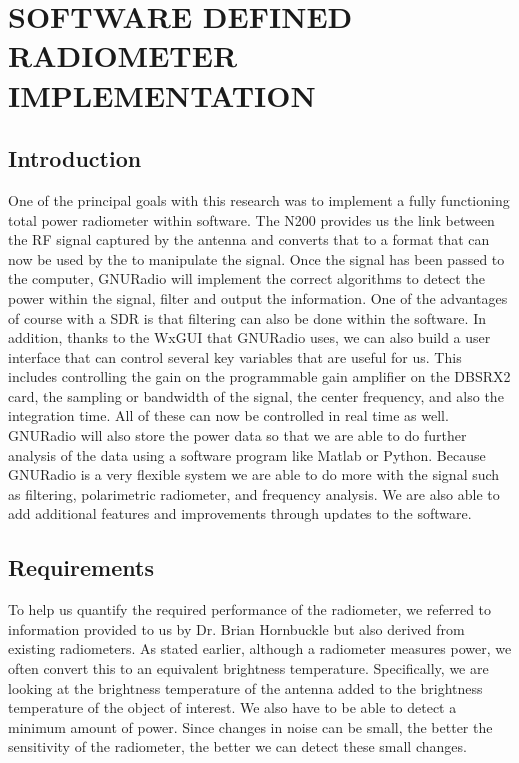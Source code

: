 \chapter{SOFTWARE DEFINED RADIOMETER IMPLEMENTATION}\label{ch:implementation}

\section{Introduction}
One of the principal goals with this research was to implement a fully functioning total power radiometer within software.  The N200 provides us the link between the RF signal captured by the antenna and converts that to a format that can now be used by the to manipulate the signal.  Once the signal has been passed to the computer, GNURadio will implement the correct algorithms to detect the power within the signal, filter and output the information.  One of the advantages of course with a SDR is that filtering can also be done within the software.  In addition, thanks to the WxGUI that GNURadio uses, we can also build a user interface that can control several key variables that are useful for us.  This includes controlling the gain on the programmable gain amplifier on the DBSRX2 card, the sampling or bandwidth of the signal, the center frequency, and also the integration time.  All of these can now be controlled in real time as well.  GNURadio will also store the power data so that we are able to do further analysis of the data using a software program like Matlab or Python.  Because GNURadio is a very flexible system we are able to do more with the signal such as filtering, polarimetric  radiometer, and frequency analysis.  We are also able to add additional features and improvements through updates to the software.

\section{Requirements}

To help us quantify the required performance of the radiometer, we referred to information provided to us by Dr. Brian Hornbuckle but also derived from existing radiometers.  As stated earlier, although a radiometer measures power, we often convert this to an equivalent brightness temperature.  Specifically, we are looking at the brightness temperature of the antenna added to the brightness temperature of the object of interest.  We also have to be able to detect a minimum amount of power.  Since changes in noise can be small, the better the sensitivity of the radiometer, the better we can detect these small changes.  

